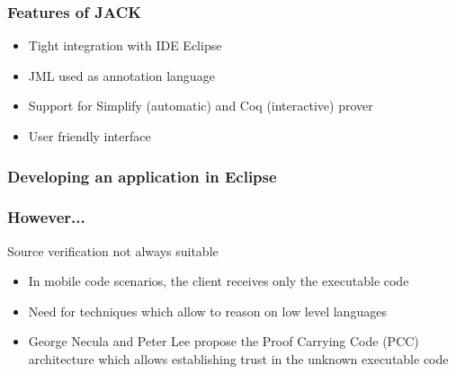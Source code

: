 \documentclass{beamer}
\begin{document}



\begin{frame}\frametitle{Features of JACK}
\begin{itemize}
\item Tight integration with IDE Eclipse
\item JML used as annotation language
\item Support for Simplify (automatic) and Coq (interactive) prover
\item User friendly interface
\end{itemize}
\end{frame}


\begin{frame}\frametitle{Developing an application in Eclipse}
\vspace*{-1.5em}
\end{frame}

\begin{frame}\frametitle{However...}
  Source verification not always suitable
   \begin{itemize}
     \item In mobile code  scenarios, the client receives only the
           executable code    
     \item Need for techniques which allow to reason on low level languages   
     \item George Necula and Peter Lee propose the Proof Carrying Code (PCC) architecture
       which allows establishing trust in the unknown executable code
   \end{itemize}  
\end{frame}
\end{document}
